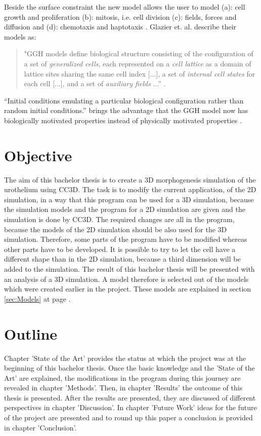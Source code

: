 Beside the surface constraint the new model allows the user to model (a): cell growth and proliferation (b): mitosis, i.e. cell division (c): fields, forces and diffusion and (d): chemotaxis and haptotaxis \cite{Glazier2007}. \newline
Glazier et. al. describe their models as: 
\begin{quote}
"GGH models define biological structure consisting of the configuration of a set of \textit{generalized cells}, each represented on a \textit{cell lattice} as a domain of lattice sites sharing the same cell index [...], a set of \textit{internal cell states} for each cell [...], and a set of \textit{auxiliary fields} ...” \cite{Glazier2007}.
\end{quote}

“Initial conditions emulating a particular biological configuration rather than random initial conditions.” \cite{Glazier2007} brings the advantage that the \ac{GGH} model now has biologically motivated properties instead of physically motivated properties \cite{Glazier2007}.



\section{Objective}
The aim of this bachelor thesis is to create a 3D morphogenesis simulation of the urothelium using \ac{CC3D}.  The task is to modify the current application, of the 2D simulation, in a way that this program can be used for a 3D simulation, because the simulation models and the program for a 2D simulation are given and the simulation is done by \ac{CC3D}. \newline
The required changes are all in the program, because the models of the 2D simulation should be also used for the 3D simulation.
Therefore, some parts of the program have to be modified whereas other parts have to be developed. It is possible to try to let the cell have a different shape than in the 2D simulation, because a third dimension will be added to the simulation.
The result of this bachelor thesis will be presented with an analysis of a 3D simulation. A model therefore is selected out of the models which were created earlier in the project. These models are explained in section \ref{sec:Models} at page \pageref{sec:Models}.


\section{Outline}
Chapter 'State of the Art' provides the status at which the project was at the beginning of this bachelor thesis. Once the basic knowledge and the 'State of the Art' are explained, the modifications in the program during this journey are revealed in chapter 'Methods'. Then, in chapter 'Results' the outcome of this thesis is presented. After the results are presented, they are discussed of different perspectives in chapter 'Discussion'. In chapter 'Future Work' ideas for the future of the project are presented and to round up this paper a conclusion is provided in chapter 'Conclusion'.